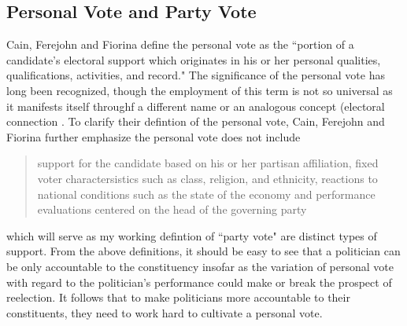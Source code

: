 \documentclass{article}
\begin{document}
		\subsection*{Personal Vote and Party Vote}
		
			Cain, Ferejohn and Fiorina
			\autocite*{cainPersonalVoteConstituency1987}
			define the personal vote as the ``portion of a candidate's electoral support which originates in his or her
			personal qualities,
			qualifications,
			activities,
			and record." 
			\autocite*[9]{cainPersonalVoteConstituency1987}
			The significance of the personal vote has long been recognized,
			though the employment of this term is not so universal as it manifests itself throughf a different name or an analogous concept
			(electoral connection
			\autocites[home style][]
			{fennoHomeStyleHouse1978}
			[electoral connection][]
			{mayhewCongressElectoralConnection1974}
			[personal reputation][]
			{careyIncentivesCultivatePersonal1995}
			[local vote][]
			{pattieWinningLocalVote1995}.
			To clarify their defintion of the personal vote,
			Cain, Ferejohn and Fiorina
			\autocite*[9]{cainPersonalVoteConstituency1987}
			further emphasize the personal vote does not include
			\begin{quotation}
				support for the candidate based on his or her partisan affiliation, fixed voter charactersistics such as class, religion, and ethnicity, reactions to national conditions such as the state of the economy and performance evaluations centered on the head of the governing party
			\end{quotation}
			which will serve as my working defintion of ``party vote" are distinct types of support.
			From the above definitions,
			it should be easy to see
			that a politician can be only accountable to the constituency
			insofar as the variation of personal vote
			with regard to the politician's performance
			could make or break the prospect of reelection.
			It follows that to make politicians more accountable to their constituents,
			they need to work hard to cultivate a personal vote.
			
\end{document}
